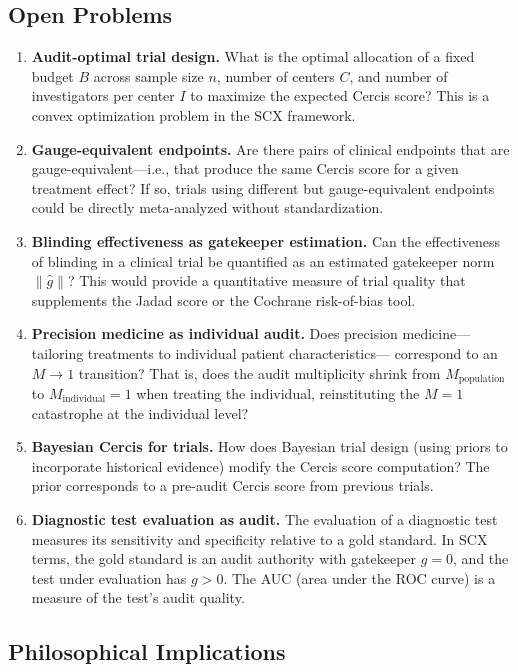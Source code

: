 \documentclass[12pt,a4paper]{article}
\theoremstyle{remark}
\newcommand{\SCX}{\textsf{SCX}}
\newcommand{\Cercis}{\textsf{Cercis}}
\begin{document}
\subsection{Open Problems}

\begin{enumerate}[leftmargin=*, label=(\arabic*)]
  \item \textbf{Audit-optimal trial design.} What is the optimal allocation
  of a fixed budget $B$ across sample size $n$, number of centers $C$,
  and number of investigators per center $I$ to maximize the expected
  \Cercis{} score? This is a convex optimization problem in the \SCX{}
  framework.
  \item \textbf{Gauge-equivalent endpoints.} Are there pairs of clinical
  endpoints that are gauge-equivalent---i.e., that produce the same
  \Cercis{} score for a given treatment effect? If so, trials using
  different but gauge-equivalent endpoints could be directly meta-analyzed
  without standardization.
  \item \textbf{Blinding effectiveness as gatekeeper estimation.} Can the
  effectiveness of blinding in a clinical trial be quantified as an
  estimated gatekeeper norm $\|\hat{g}\|$? This would provide a quantitative
  measure of trial quality that supplements the Jadad score or the
  Cochrane risk-of-bias tool.
  \item \textbf{Precision medicine as individual audit.} Does precision
  medicine---tailoring treatments to individual patient characteristics---
  correspond to an $M \to 1$ transition? That is, does the audit
  multiplicity shrink from $M_{\text{population}}$ to
  $M_{\text{individual}} = 1$ when treating the individual, reinstituting
  the $M=1$ catastrophe at the individual level?
  \item \textbf{Bayesian Cercis for trials.} How does Bayesian trial design
  (using priors to incorporate historical evidence) modify the \Cercis{}
  score computation? The prior corresponds to a pre-audit \Cercis{} score
  from previous trials.
  \item \textbf{Diagnostic test evaluation as audit.} The evaluation of a
  diagnostic test measures its sensitivity and specificity relative to a
  gold standard. In \SCX{} terms, the gold standard is an audit authority
  with gatekeeper $g = 0$, and the test under evaluation has $g > 0$. The
  AUC (area under the ROC curve) is a measure of the test's audit quality.
\end{enumerate}

\subsection{Philosophical Implications}
\end{document}
